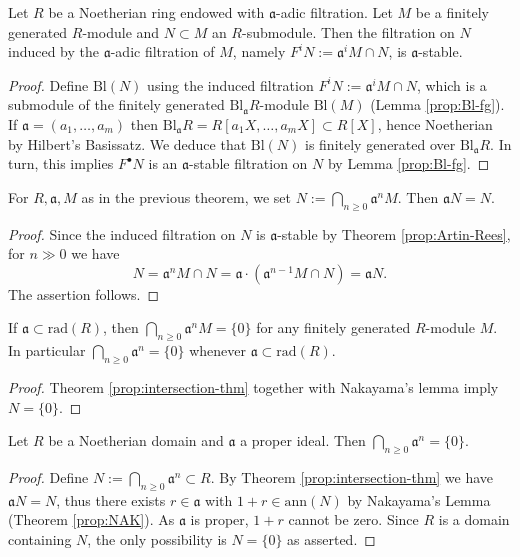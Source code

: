 \begin{theorem}\label{prop:Artin-Rees}
	Let $R$ be a Noetherian ring endowed with $\mathfrak{a}$-adic filtration. Let $M$ be a finitely generated $R$-module and $N \subset M$ an $R$-submodule. Then the filtration on $N$ induced by the $\mathfrak{a}$-adic filtration of $M$, namely $F^i N := \mathfrak{a}^i M \cap N$, is $\mathfrak{a}$-stable.
\end{theorem}
\begin{proof}
	Define $\text{Bl}(N)$ using the induced filtration $F^i N := \mathfrak{a}^i M \cap N$, which is a submodule of the finitely generated $\text{Bl}_{\mathfrak{a}} R$-module $\text{Bl}(M)$ (Lemma \ref{prop:Bl-fg}). If $\mathfrak{a} = (a_1, \ldots, a_m)$ then $\text{Bl}_{\mathfrak{a}} R = R[a_1 X, \ldots, a_m X] \subset R[X]$, hence Noetherian by Hilbert's Basissatz. We deduce that $\text{Bl}(N)$ is finitely generated over $\text{Bl}_{\mathfrak{a}} R$. In turn, this implies $F^\bullet N$ is an $\mathfrak{a}$-stable filtration on $N$ by Lemma \ref{prop:Bl-fg}.
\end{proof}

\begin{theorem}\label{prop:intersection-thm}
	For $R, \mathfrak{a}, M$ as in the previous theorem, we set $N := \bigcap_{n \geq 0} \mathfrak{a}^n M$. Then $\mathfrak{a}N = N$.
\end{theorem}
\begin{proof}
	Since the induced filtration on $N$ is $\mathfrak{a}$-stable by Theorem \ref{prop:Artin-Rees}, for $n \gg 0$ we have
	\[ N = \mathfrak{a}^n M \cap N = \mathfrak{a} \cdot (\mathfrak{a}^{n-1} M \cap N) = \mathfrak{a} N. \]
	The assertion follows.
\end{proof}

\begin{corollary}[Krull]\label{prop:Krull-intersection-rad}
	If $\mathfrak{a} \subset \mathrm{rad}(R)$, then $\bigcap_{n \geq 0} \mathfrak{a}^n M = \{0\}$ for any finitely generated $R$-module $M$. In particular $\bigcap_{n \geq 0} \mathfrak{a}^n = \{0\}$ whenever $\mathfrak{a} \subset \mathrm{rad}(R)$.
\end{corollary}
\begin{proof}
	Theorem \ref{prop:intersection-thm} together with Nakayama's lemma imply $N = \{0\}$.
\end{proof}

\begin{corollary}\label{prop:Krull-intersection-domain}
	Let $R$ be a Noetherian domain and $\mathfrak{a}$ a proper ideal. Then $\bigcap_{n \geq 0} \mathfrak{a}^n = \{0\}$.
\end{corollary}
\begin{proof}
	Define $N := \bigcap_{n \geq 0} \mathfrak{a}^n \subset R$. By Theorem \ref{prop:intersection-thm} we have $\mathfrak{a}N = N$, thus there exists $r \in \mathfrak{a}$ with $1+r \in \text{ann}(N)$ by Nakayama's Lemma (Theorem \ref{prop:NAK}). As $\mathfrak{a}$ is proper, $1+r$ cannot be zero. Since $R$ is a domain containing $N$, the only possibility is $N=\{0\}$ as asserted.
\end{proof}

